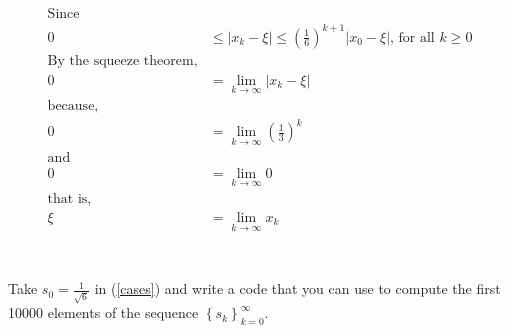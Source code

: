 \documentclass{article}
\begin{document}
\begin{align*}
     \text{Since}&\\
     0 & \le |x_k-\xi| \le \left(\frac{1}{6} \right)^{k+1}|x_0-\xi| \text{, for all }k \ge 0\\
     \text{By the squeeze theorem,}&\\
     0&= \lim_{k \to \infty} |x_k - \xi|\\
     \text{because,}\\
     0& =\lim_{k \to \infty} \left(\frac{1}{3} \right)^k\\
     \text{and}&\\
     0& =\lim_{k \to \infty}0\\
     \text{that is,}\\
     \xi &= \lim_{k \to \infty}x_k\\
\end{align*}



\section{}
Take $s_0 = \frac{1}{\sqrt{6}}$ in (\ref{cases}) and write a code that you can use to compute the first 10000 elements of the sequence $\left\{ s_k \right\}^{\infty}_{k=0}$.
\vspace{10mm}
\end{document}
